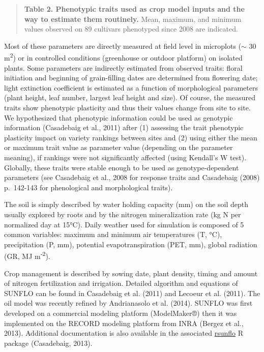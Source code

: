 \documentclass[a4paper]{article}
\begin{document}
\normalsize

\begin{quote}
\textbf{Table 2. Phenotypic traits used as crop model inputs and the way
to estimate them routinely.} Mean, maximum, and minimum values observed
on 89 cultivars phenotyped since 2008 are indicated.
\end{quote}

Most of these parameters are directly measured at field level in
microplots (\(\sim\) 30 m\textsuperscript{2}) or in controlled
conditions (greenhouse or outdoor platform) on isolated plants. Some
parameters are indirectly estimated from observed traits: floral
initiation and beginning of grain-filling dates are determined from
flowering date; light extinction coefficient is estimated as a function
of morphological parameters (plant height, leaf number, largest leaf
height and size). Of course, the measured traits show phenotypic
plasticity and thus their values change from site to site. We
hypothesized that phenotypic information could be used as genotypic
information (Casadebaig et al., 2011) after (1) assessing the trait
phenotypic plasticity impact on variety rankings between sites and (2)
using either the mean or maximum trait value as parameter value
(depending on the parameter meaning), if rankings were not significantly
affected (using Kendall's W test). Globally, these traits were stable
enough to be used as genotype-dependent parameters (see Casadebaig et
al., 2008 for response traits and Casadebaig (2008) p.~142-143 for
phenological and morphological traits).

The soil is simply described by water holding capacity (mm) on the soil
depth usually explored by roots and by the nitrogen mineralization rate
(kg N per normalized day at 15°C). Daily weather used for simulation is
composed of 5 common variables: maximum and minimum air temperatures (T,
°C), precipitation (P, mm), potential evapotranspiration (PET, mm),
global radiation (GR, MJ m\textsuperscript{-2}).

Crop management is described by sowing date, plant density, timing and
amount of nitrogen fertilization and irrigation. Detailed algorithm and
equations of SUNFLO can be found in Casadebaig et al. (2011) and Lecoeur
et al. (2011). The oil model was recently refined by Andrianasolo et al.
(2014). SUNFLO was first developed on a commercial modeling platform
(ModelMaker®) then it was implemented on the RECORD modeling platform
from INRA (Bergez et al., 2013). Additional documentation is also
available in the associated
\href{https://github.com/picasa/rsunflo}{rsunflo} R package (Casadebaig,
2013).
\end{document}
